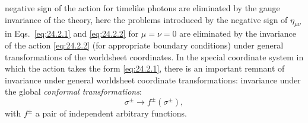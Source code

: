 negative sign of the action for timelike photons are eliminated by the gauge
invariance of the theory, here the problems introduced by the negative sign
of \(\eta_{\mu\nu}\) in Eqs.~\eqref{eq:24.2.1} and \eqref{eq:24.2.2} for
\(\mu=\nu=0\) are eliminated by the invariance of the action
\eqref{eq:24.2.2} (for appropriate boundary conditions) under general
transformations of the worldsheet coordinates. In the special coordinate
system in which the action takes the form \eqref{eq:24.2.1}, there is an
important remnant of invariance under general worldsheet coordinate
transformations: invariance under the global \emph{conformal transformations}:
\begin{equation}
\sigma^\pm\longrightarrow f^\pm(\sigma^\pm),
\tag{24.2.4}\label{eq:24.2.4}
\end{equation}
with \(f^\pm\) a pair of independent arbitrary functions.


